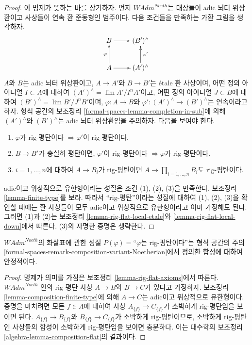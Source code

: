 \begin{proof}
이 명제가 뜻하는 바를 상기하자. 먼저 $\textit{WAdm}^{Noeth}$는
대상들이 adic 뇌터 위상환이고 사상들이 연속 환 준동형인 범주이다.
다음 조건들을 만족하는 가환 그림을 생각하자.
$$
\xymatrix{
B \ar[r] & (B')^\wedge \\
A \ar[r] \ar[u]^\varphi & (A')^\wedge \ar[u]_{\varphi'}
}
$$
$A$와 $B$는 adic 뇌터 위상환이고,
$A \to A'$와 $B \to B'$는 \'etale 환 사상이며,
어떤 정의 아이디얼 $I \subset A$에 대하여
$(A')^\wedge = \lim A'/I^nA'$이고,
어떤 정의 아이디얼 $J \subset B$에 대하여
$(B')^\wedge = \lim B'/J^nB'$이며,
$\varphi : A \to B$와 $\varphi' : (A')^\wedge \to (B')^\wedge$는 연속이라고 하자.
형식 공간의 보조정리 \ref{formal-spaces-lemma-completion-in-sub}에 의해
$(A')^\wedge$와 $(B')^\wedge$는 adic 뇌터 위상환임을 주의하자.
다음을 보여야 한다.
\begin{enumerate}
\item $\varphi$가 rig-평탄이다 $\Rightarrow \varphi'$이 rig-평탄이다.
\item $B \to B'$가 충실히 평탄이면, $\varphi'$이 rig-평탄이다
$\Rightarrow \varphi$가 rig-평탄이다.
\item $i = 1, \ldots, n$에 대하여 $A \to B_i$가 rig-평탄이면
$A \to \prod_{i = 1, \ldots, n} B_i$도 rig-평탄이다.
\end{enumerate}
adic이고 위상적으로 유한형이라는 성질은 조건 (1), (2), (3)을 만족한다.
보조정리 \ref{lemma-finite-type}를 보라. 따라서 ``rig-평탄''이라는 성질에
대하여 (1), (2), (3)을 확인할 때에는 환 사상들이 모두 adic이고
위상적으로 유한형이라고 이미 가정해도 된다. 그러면 (1)과 (2)는 보조정리
\ref{lemma-rig-flat-local-etale}와
\ref{lemma-rig-flat-local-down}에서 따른다. (3)의 자명한 증명은 생략한다.
\end{proof}

\begin{lemma}
\label{lemma-composition-rig-flat-continuous}
$\textit{WAdm}^{Noeth}$의 화살표에 관한 성질
$P(\varphi)=$``$\varphi$는 rig-평탄이다''는 형식 공간의 주의
\ref{formal-spaces-remark-composition-variant-Noetherian}에서 정의한
합성에 대하여 안정적이다.
\end{lemma}

\begin{proof}
명제가 의미를 가짐은 보조정리 \ref{lemma-rig-flat-axioms}에서 따른다.
$\textit{WAdm}^{Noeth}$ 안의 rig-평탄 사상
$A \to B$와 $B \to C$가 있다고 가정하자.
보조정리 \ref{lemma-composition-finite-type}에 의해
$A \to C$는 adic이고 위상적으로 유한형이다.
증명을 마치려면 모든 $f \in A$에 대하여 사상
$A_{\{f\}} \to C_{\{f\}}$가 소박하게 rig-평탄임을 보이면 된다.
$A_{\{f\}} \to B_{\{f\}}$와 $B_{\{f\}} \to C_{\{f\}}$가
소박하게 rig-평탄이므로, 소박하게 rig-평탄인 사상들의 합성이
소박하게 rig-평탄임을 보이면 충분하다.
이는 대수학의 보조정리 \ref{algebra-lemma-composition-flat}의 결과이다.
\end{proof}

